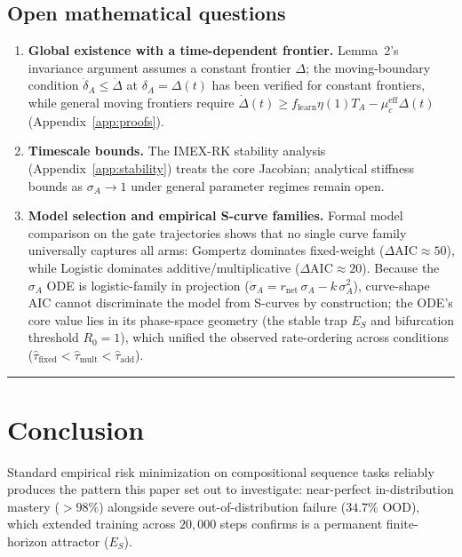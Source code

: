 \documentclass{article}
\theoremstyle{definition}
\begin{document}
\subsection{Open mathematical questions}

\begin{enumerate}[nosep]
\item \textbf{Global existence with a time-dependent frontier.}
  Lemma~2's invariance argument assumes a constant frontier $\Delta$;
  the moving-boundary condition $\dot{\delta}_A \leq \dot{\Delta}$ at
  $\delta_A = \Delta(t)$ has been verified for constant frontiers, while general moving frontiers require $\dot{\Delta}(t) \ge f_{\text{learn}} \eta(1) T_A - \mu_c^{\text{eff}} \Delta(t)$ (Appendix~\ref{app:proofs}).
\item \textbf{Timescale bounds.}
  The IMEX-RK stability analysis (Appendix~\ref{app:stability}) treats
  the core Jacobian; analytical stiffness bounds as $\sigma_A \to 1$ under general parameter regimes remain open.
\item \textbf{Model selection and empirical S-curve families.}
  Formal model comparison on the gate trajectories shows that no single curve family universally captures all arms: Gompertz dominates fixed-weight ($\Delta\text{AIC} \approx 50$), while Logistic dominates additive/multiplicative ($\Delta\text{AIC} \approx 20$). Because the $\sigma_A$ ODE is logistic-family in projection ($\dot{\sigma}_A = r_{\text{net}}\,\sigma_A - k\,\sigma_A^2$), curve-shape AIC cannot discriminate the model from S-curves by construction; the ODE's core value lies in its phase-space geometry (the stable trap $E_S$ and bifurcation threshold $R_0 = 1$), which unified the observed rate-ordering across conditions ($\hat{\tau}_{\text{fixed}} < \hat{\tau}_{\text{mult}} < \hat{\tau}_{\text{add}}$).
\end{enumerate}

\noindent\rule{\linewidth}{0.4pt}

\section{Conclusion}\label{sec:conclusion}

Standard empirical risk minimization on compositional sequence tasks reliably produces the pattern this paper set out to investigate: near-perfect in-distribution mastery ($>98\%$) alongside severe out-of-distribution failure ($34.7\%$ OOD), which extended training across $20{,}000$ steps confirms is a permanent finite-horizon attractor ($E_S$).
\end{document}

